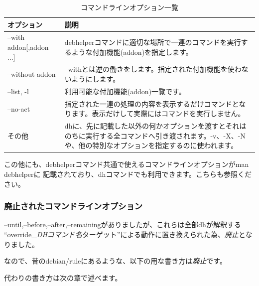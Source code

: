 \documentclass[mingoth,a4paper]{jsarticle}
\begin{document}
\begin{table}[ht]
\begin{center}
\small
\begin{tabular}{|p{10em}|p{33em}|}
\hline
オプション&説明 \\
\hline
--with addon[,addon ...] & debhelperコマンドに適切な場所で一連のコマンドを実行するような付加機能(addon)を指定します。\\
\hline
--without addon　& --withとは逆の働きをします。指定された付加機能を使わないようにします。\\
\hline
--list, -l & 利用可能な付加機能(addon)一覧です。\\
\hline
--no-act & 指定された一連の処理の内容を表示するだけコマンドとなります。表示だけして実際にはコマンドを実行しません。\\
\hline
その他 & dhに、先に記載した以外の何かオプションを渡すとそれはのちに実行する全コマンドへ引き渡されます。-v、-X、-Nや、他の特別なオプションを指定するのに使われます。\\
\hline
\end{tabular}
\caption{コマンドラインオプション一覧}
\label{tab:sequence-dh}
\end{center}
\end{table}

この他にも、debhelperコマンド共通で使えるコマンドラインオプションがman debhelperに
記載されており、dhコマンドでも利用できます。こちらも参照ください。

\subsubsection{廃止されたコマンドラインオプション}

--until,--before,--after,--remainingがありましたが、これらは全部dhが解釈する
``override\_{\em DHコマンド名}ターゲット''による動作に置き換えられた為、{\em 廃止}となりました。

なので、昔のdebian/ruleにあるような、以下の用な書き方は{\em 廃止}です。


代わりの書き方は次の章で述べます。
\end{document}
